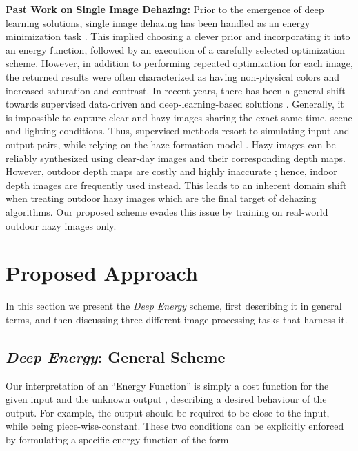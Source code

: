 \documentclass[journal]{IEEEtran}
\newcommand{\smallpar}[1]{\textbf{#1}\hspace{0.2cm}}
\begin{document}
\noindent \smallpar{Past Work on Single Image Dehazing: }
Prior to the emergence of deep learning solutions, single image dehazing has been handled as an energy minimization task \cite{contrast_tan,energy_dehazing,BCCR,color_lines,NLD}. This implied choosing a clever prior and incorporating it into an energy function, followed by an execution of a carefully selected optimization scheme. However, in addition to performing repeated optimization for each image, the returned results were often characterized as having non-physical colors and increased saturation and contrast. In recent years, there has been a general shift towards supervised data-driven and deep-learning-based solutions \cite{CAP,mscnn,dehazenet,aodnet,GFN}. Generally, it is impossible to capture clear and hazy images sharing the exact same time, scene and lighting conditions. Thus, supervised methods resort to simulating input and output pairs, while relying on the haze formation model \cite{haze_model}. Hazy images can be reliably synthesized using clear-day images and their corresponding depth maps. However, outdoor depth maps are costly and highly inaccurate \cite{reside}; hence, indoor depth images are frequently used instead. This leads to an inherent domain shift when treating outdoor hazy images which are the final target of dehazing algorithms. Our proposed scheme evades this issue by training on real-world outdoor hazy images only. 



\section{Proposed Approach}\label{s:method}

In this section we present the \emph{Deep Energy} scheme, first describing it in general terms, and then discussing three different image processing tasks that harness it.

\subsection{\emph{Deep Energy}: General Scheme} \label{ss:general}

Our interpretation of an ``Energy Function'' is simply a cost function  for the given input  and the unknown output , describing a desired behaviour of the output. For example, the output should be required to be close to the input, while being piece-wise-constant. These two conditions can be explicitly enforced by formulating a specific energy function of the form
 
\end{document}
